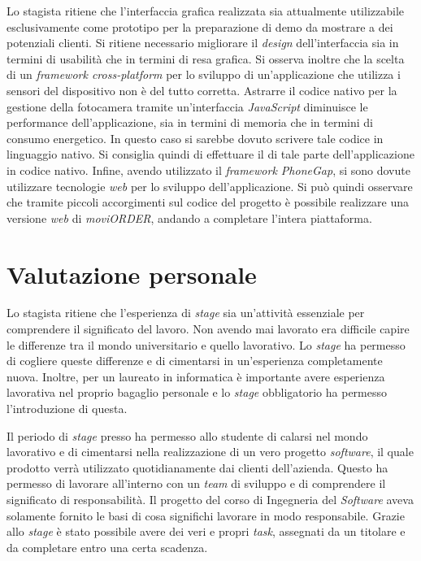 Lo stagista ritiene che l'interfaccia grafica realizzata sia attualmente utilizzabile esclusivamente come prototipo per la preparazione di demo da mostrare a dei potenziali clienti. Si ritiene necessario migliorare il \textit{design} dell'interfaccia sia in termini di usabilità che in termini di resa grafica. 
Si osserva inoltre che la scelta di un \textit{framework cross-platform} per lo sviluppo di un'applicazione che utilizza i sensori del dispositivo non è del tutto corretta. Astrarre il codice nativo per la gestione della fotocamera tramite un'interfaccia \textit{JavaScript} diminuisce le performance dell'applicazione, sia in termini di memoria che in termini di consumo energetico. In questo caso si sarebbe dovuto scrivere tale codice in linguaggio nativo. Si consiglia quindi di effettuare il  di tale parte dell'applicazione in codice nativo.
Infine, avendo utilizzato il \textit{framework PhoneGap}, si sono dovute utilizzare tecnologie \textit{web} per lo sviluppo dell'applicazione. Si può quindi osservare che tramite piccoli accorgimenti sul codice del progetto è possibile realizzare una versione \textit{web} di \textit{moviORDER}, andando a completare l'intera piattaforma.

\section{Valutazione personale}

Lo stagista ritiene che l'esperienza di \textit{stage} sia un'attività essenziale per comprendere il significato del lavoro. Non avendo mai lavorato era difficile capire le differenze tra il mondo universitario e quello lavorativo. Lo \textit{stage} ha permesso di cogliere queste differenze e di cimentarsi in un'esperienza completamente nuova. Inoltre, per un laureato in informatica è importante avere esperienza lavorativa nel proprio bagaglio personale e lo \textit{stage} obbligatorio ha permesso l'introduzione di questa.

Il periodo di \textit{stage} presso \visione{} ha permesso allo studente di calarsi nel mondo lavorativo e di cimentarsi nella realizzazione di un vero progetto \textit{software}, il quale prodotto verrà utilizzato quotidianamente dai clienti dell'azienda. Questo ha permesso di lavorare all'interno con un \textit{team} di sviluppo e di comprendere il significato di responsabilità. Il progetto del corso di Ingegneria del \textit{Software} aveva solamente fornito le basi di cosa significhi lavorare in modo responsabile. Grazie allo \textit{stage} è stato possibile avere dei veri e propri \textit{task}, assegnati da un titolare e da completare entro una certa scadenza.

